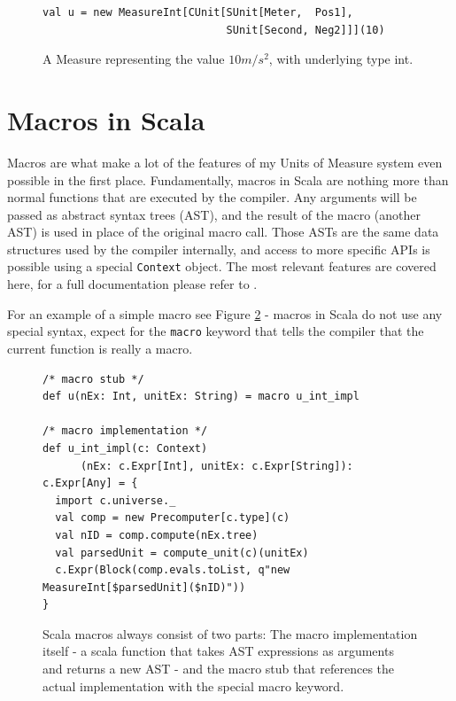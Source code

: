 \documentclass[12pt,oneside,a4paper]{scrbook}
\begin{document}
\begin{figure}
\begin{verbatim}
val u = new MeasureInt[CUnit[SUnit[Meter,  Pos1],
                             SUnit[Second, Neg2]]](10)
\end{verbatim}
\caption{A Measure representing the value $10 m/s^2$, with underlying type int.}
\label{code:scala_measure}
\end{figure}


\section{Macros in Scala}
\label{sec:macros}

Macros are what make a lot of the features of my Units of Measure system even possible in the first place. Fundamentally, macros in Scala are nothing more than normal functions that are executed by the compiler. Any arguments will be passed as abstract syntax trees (AST), and the result of the macro (another AST) is used in place of the original macro call. Those ASTs are the same data structures used by the compiler internally, and access to more specific APIs is possible using a special \verb|Context| object. The most relevant features are covered here, for a full documentation please refer to \citep{Eugene13}.

For an example of a simple macro see Figure \ref{code:scala_macro} - macros in Scala do not use any special syntax, expect for the \verb|macro| keyword that tells the compiler that the current function is really a macro.



\begin{figure}
\begin{verbatim}
/* macro stub */
def u(nEx: Int, unitEx: String) = macro u_int_impl

/* macro implementation */
def u_int_impl(c: Context)
      (nEx: c.Expr[Int], unitEx: c.Expr[String]): c.Expr[Any] = {
  import c.universe._
  val comp = new Precomputer[c.type](c)
  val nID = comp.compute(nEx.tree)
  val parsedUnit = compute_unit(c)(unitEx)
  c.Expr(Block(comp.evals.toList, q"new MeasureInt[$parsedUnit]($nID)"))
}
\end{verbatim}
\caption{Scala macros always consist of two parts: The macro implementation itself - a scala function that takes AST expressions as arguments and returns a new AST - and the macro stub that references the actual implementation with the special macro keyword.}
\label{code:scala_macro}
\end{figure}
\end{document}
